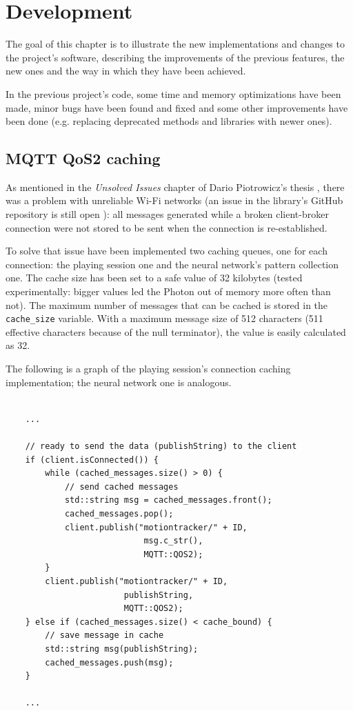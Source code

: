 \chapter{Development}
The goal of this chapter is to illustrate the new implementations and changes to the project's software, describing the improvements of the previous features, the new ones and the way in which they have been achieved.
\bigbreak

In the previous project's code, some time and memory optimizations have been made, minor bugs have been found and fixed and some other improvements have been done (e.g. replacing deprecated methods and libraries with newer ones).

\section{MQTT QoS2 caching}
As mentioned in the \textit{Unsolved Issues} chapter of Dario Piotrowicz's thesis \cite{Pio19}, there was a problem with unreliable Wi-Fi networks (an issue in the library's GitHub repository is still open \cite{githubQos2Issue}): all messages generated while a broken client-broker connection were not stored to be sent when the connection is re-established.

To solve that issue have been implemented two caching queues, one for each connection: the playing session one and the neural network's pattern collection one. The cache size has been set to a safe value of 32 kilobytes (tested experimentally: bigger values led the Photon out of memory more often than not). The maximum number of messages that can be cached is stored in the \texttt{cache\_size} variable. With a maximum message size of 512 characters (511 effective characters because of the null terminator), the value is easily calculated as 32.

The following is a graph of the playing session's connection caching implementation; the neural network one is analogous.
\bigbreak

\begin{lstlisting}[style=CPPStyle]

	...

	// ready to send the data (publishString) to the client
	if (client.isConnected()) {
        while (cached_messages.size() > 0) {
			// send cached messages
            std::string msg = cached_messages.front();
            cached_messages.pop();
			client.publish("motiontracker/" + ID,
							msg.c_str(),
							MQTT::QOS2);
        }
		client.publish("motiontracker/" + ID,
						publishString,
						MQTT::QOS2);
    } else if (cached_messages.size() < cache_bound) {
		// save message in cache
        std::string msg(publishString);
        cached_messages.push(msg);
    }

	...

\end{lstlisting}
\bigbreak

